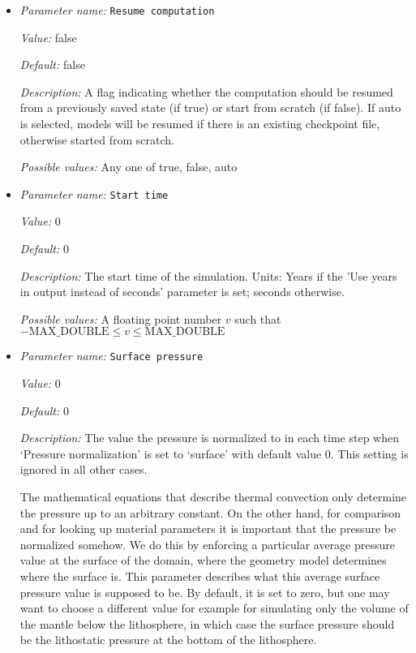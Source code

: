 \begin{itemize}
{\it Possible values:} Any one of surface, volume, no
\item {\it Parameter name:} {\tt Resume computation}
\label{parameters:Resume computation}


{\it Value:} false


{\it Default:} false


{\it Description:} A flag indicating whether the computation should be resumed from a previously saved state (if true) or start from scratch (if false). If auto is selected, models will be resumed if there is an existing checkpoint file, otherwise started from scratch.


{\it Possible values:} Any one of true, false, auto
\item {\it Parameter name:} {\tt Start time}
\label{parameters:Start time}


{\it Value:} 0


{\it Default:} 0


{\it Description:} The start time of the simulation. Units: Years if the 'Use years in output instead of seconds' parameter is set; seconds otherwise.


{\it Possible values:} A floating point number $v$ such that $-\text{MAX\_DOUBLE} \leq v \leq \text{MAX\_DOUBLE}$
\item {\it Parameter name:} {\tt Surface pressure}
\label{parameters:Surface pressure}


{\it Value:} 0


{\it Default:} 0


{\it Description:} The value the pressure is normalized to in each time step when `Pressure normalization' is set to `surface' with default value 0. This setting is ignored in all other cases.

The mathematical equations that describe thermal convection only determine the pressure up to an arbitrary constant. On the other hand, for comparison and for looking up material parameters it is important that the pressure be normalized somehow. We do this by enforcing a particular average pressure value at the surface of the domain, where the geometry model determines where the surface is. This parameter describes what this average surface pressure value is supposed to be. By default, it is set to zero, but one may want to choose a different value for example for simulating only the volume of the mantle below the lithosphere, in which case the surface pressure should be the lithostatic pressure at the bottom of the lithosphere.


\end{itemize}
